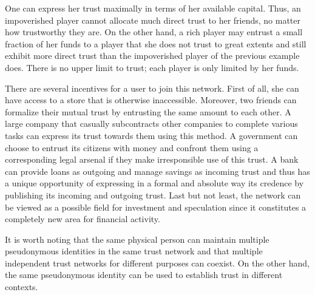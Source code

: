   One can express her trust maximally in terms of her available capital. Thus, an impoverished player cannot allocate much
  direct trust to her friends, no matter how trustworthy they are. On the other hand, a rich player may entrust a small
  fraction of her funds to a player that she does not trust to great extents and still exhibit more direct trust than
  the impoverished player of the previous example does. There is no upper limit to trust; each player is only limited by
  her funds.

  There are several incentives for a user to join this network. First of all, she can have access to a store that is
  otherwise inaccessible. Moreover, two friends can formalize their mutual trust by entrusting the same amount to each
  other. A large company that casually subcontracts other companies to complete various tasks can express its trust
  towards them using this method. A government can choose to entrust its citizens with money and confront them using a
  corresponding legal arsenal if they make irresponsible use of this trust. A bank can provide loans as outgoing and
  manage savings as incoming trust and thus has a unique opportunity of expressing in a formal and absolute way its
  credence by publishing its incoming and outgoing trust. Last but not least, the network can be viewed as a possible
  field for investment and speculation since it constitutes a completely new area for financial activity.

  It is worth noting that the same physical person can maintain multiple pseudonymous identities in the same trust network
  and that multiple independent trust networks for different purposes can coexist. On the other hand, the same
  pseudonymous identity can be used to establish trust in different contexts.
